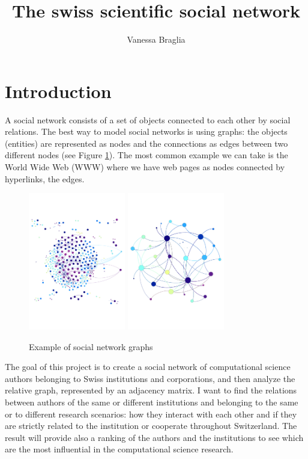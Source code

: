 \documentclass[]{usiinfbachelorproject}
\author{Vanessa Braglia}
\title{The swiss scientific social network}
\begin{document}
\maketitle
\newpage
\tableofcontents
\newpage

\section{Introduction} \label{sec:intro} 

A social network consists of a set of objects connected to each other by social relations. The best way to model social networks is using graphs: the objects (entities) are represented as nodes and the connections as edges between two different nodes (see Figure \ref{fig:socialnetwork}). The most common example we can take is the World Wide Web (WWW) where we have web pages as nodes connected by hyperlinks, the edges.

\begin{figure}[ht]
	\centering
	\includegraphics[height=6cm]{img/graph_auth.pdf}
	\qquad\qquad
	\includegraphics[height=6cm]{img/graph_uni.pdf}
	\caption{Example of social network graphs}
	\label{fig:socialnetwork}
\end{figure}

The goal of this project is to create a social network of computational science authors belonging to Swiss institutions and corporations, and then analyze the relative graph, represented by an adjacency matrix. I want to find the relations between authors of the same or different institutions and belonging to the same or to different research scenarios: how they interact with each other and if they are strictly related to the institution or cooperate throughout Switzerland. The result will provide also a ranking of the authors and the institutions to see which are the most influential in the computational science research.
\end{document}
